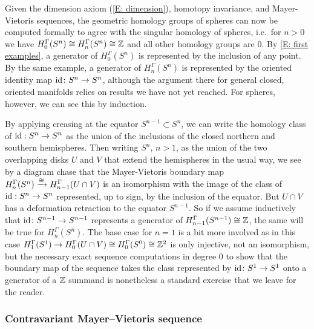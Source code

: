 \begin{example}\label{E: sphere homology}
Given the dimension axiom (\cref{E: dimension}), homotopy invariance, and Mayer-Vietoris sequences, the geometric homology groups of spheres can now be computed formally to agree with the singular homology of spheres, i.e.\ for $n>0$ we have $H_0^{\Gamma}(S^n)\cong H_n^\Gamma(S^n)\cong \mathbb{Z}$ and all other homology groups are $0$.
By \cref{E: first examples}, a generator of $H_0^{\Gamma}(S^n)$ is represented by the inclusion of any point.
By the same example, a generator of $H_n^{\Gamma}(S^n)$ is represented by the oriented identity map $\mathrm{id} \colon S^n \to S^n$, although the argument there for general closed, oriented manifolds relies on results we have not yet reached.
For spheres, however, we can see this by induction.

By applying creasing at the equator $S^{n-1}\subset S^n$, we can write the homology class of $\mathrm{id}: S^n \to S^n$ as the union of the inclusions of the closed northern and southern hemispheres. Then writing $S^n$, $n>1$, as the union of the two overlapping disks $U$ and $V$ that extend the hemispheres in the usual way, we see by a diagram chase that the Mayer-Vietoris boundary map $H_n^\Gamma(S^n)\xrightarrow{\cong} H_{n-1}^\Gamma(U \cap V)$ is an isomorphism with the image of the class of $\mathrm{id}: S^n \to S^n$ represented, up to sign, by the inclusion of the equator.
But $U \cap V$ has a deformation retraction to the equator $S^{n-1}$.
So if we assume inductively that $\mathrm{id} \colon S^{n-1} \to S^{n-1}$ represents a generator of $H_{n-1}^\Gamma(S^{n-1})\cong \mathbb{Z}$, the same will be true for $H_n^\Gamma(S^n)$.
The base case for $n=1$ is a bit more involved as in this case $H_1^\Gamma(S^1) \to H_{0}^\Gamma(U \cap V) \cong H_0^\Gamma(S^0) \cong \mathbb{Z}^2$ is only injective, not an isomorphism, but the necessary exact sequence computations in degree $0$ to show that the boundary map of the sequence takes the class represented by $\mathrm{id} \colon S^1 \to S^1$ onto a generator of a $\mathbb{Z}$ summand is nonetheless a standard exercise that we leave for the reader.
\end{example}

\subsubsection{Contravariant Mayer--Vietoris sequence}


